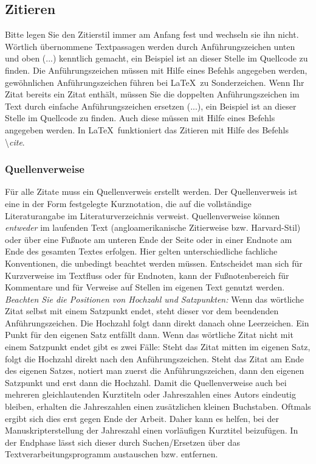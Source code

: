 \documentclass[a4paper,11pt]{article}%
\renewcommand{\\}{\vspace*{0.5\baselineskip} \newline}
\begin{document}
\subsection{Zitieren}
Bitte legen Sie den Zitierstil immer am Anfang fest und wechseln sie ihn nicht.\\
Wörtlich übernommene Textpassagen werden durch Anführungszeichen unten und oben (\glqq...\grqq) kenntlich gemacht, ein Beispiel ist an dieser Stelle im Quellcode zu finden. Die Anführungszeichen müssen mit Hilfe eines Befehls angegeben werden, gewöhnlichen Anführungszeichen führen bei \LaTeX~zu Sonderzeichen.\\
Wenn Ihr Zitat bereits ein Zitat enthält, müssen Sie die doppelten Anführungszeichen im Text durch einfache Anführungszeichen ersetzen (\glq...\grq), ein Beispiel ist an dieser Stelle im Quellcode zu finden. Auch diese müssen mit Hilfe eines Befehls angegeben werden.\\
In \LaTeX~funktioniert das Zitieren\cite[Beispielzitat aus Quelle 7]{FN} mit Hilfe des Befehls \textbackslash\textit{cite}.

\subsubsection{Quellenverweise}
Für alle Zitate muss ein Quellenverweis erstellt werden. Der Quellenverweis ist eine in der Form festgelegte Kurznotation, die auf die vollständige Literaturangabe im Literaturverzeichnis verweist. Quellenverweise können \textit{entweder} im laufenden Text (angloamerikanische Zitierweise bzw. Harvard-Stil) oder über eine Fußnote am unteren Ende der Seite oder in einer Endnote am Ende des gesamten Textes erfolgen. Hier gelten unterschiedliche fachliche Konventionen, die unbedingt beachtet werden müssen.\\
Entscheidet man sich für Kurzverweise im Textfluss oder für Endnoten, kann der Fußnotenbereich für Kommentare und für Verweise auf Stellen im eigenen Text genutzt werden.\\
\textit{Beachten Sie die Positionen von Hochzahl und Satzpunkten:}\\ 
Wenn das wörtliche Zitat selbst mit einem Satzpunkt endet, steht dieser vor dem beendenden Anführungszeichen. Die Hochzahl folgt dann direkt danach ohne Leerzeichen. Ein Punkt für den eigenen Satz entfällt dann.\\
Wenn das wörtliche Zitat nicht mit einem Satzpunkt endet gibt es zwei Fälle: Steht das Zitat mitten im eigenen Satz, folgt die Hochzahl direkt nach den Anführungszeichen.\\
Steht das Zitat am Ende des eigenen Satzes, notiert man zuerst die Anführungszeichen, dann den eigenen Satzpunkt und erst dann die Hochzahl.\\
Damit die Quellenverweise auch bei mehreren gleichlautenden Kurztiteln oder Jahreszahlen eines Autors eindeutig bleiben, erhalten die Jahreszahlen einen zusätzlichen kleinen Buchstaben. Oftmals ergibt sich dies erst gegen Ende der Arbeit. Daher kann es helfen, bei der Manuskripterstellung der Jahreszahl einen vorläufigen Kurztitel beizufügen. In der Endphase lässt sich dieser durch Suchen/Ersetzen über das Textverarbeitungsprogramm austauschen bzw. entfernen.
\end{document}

